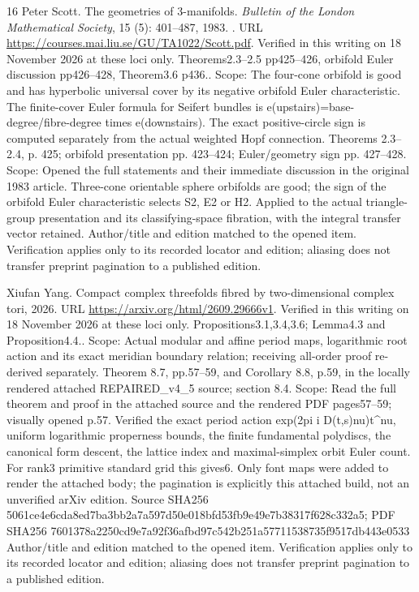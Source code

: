 \documentclass[11pt,a4paper]{article}
\theoremstyle{definition}
\begin{document}
\begin{thebibliography}{16}
Peter Scott.
\newblock The geometries of 3-manifolds.
\newblock \emph{Bulletin of the London Mathematical Society}, 15
  (5): 401--487, 1983.
\newblock {}.
\newblock URL \url{https://courses.mai.liu.se/GU/TA1022/Scott.pdf}.
\newblock Verified in this writing on 18 November 2026 at these loci only.
  Theorems2.3–2.5 pp425–426, orbifold Euler discussion pp426–428,
  Theorem3.6 p436.. Scope: The four-cone orbifold is good and has hyperbolic
  universal cover by its negative orbifold Euler characteristic. The
  finite-cover Euler formula for Seifert bundles is
  e(upstairs)=base-degree/fibre-degree times e(downstairs). The exact
  positive-circle sign is computed separately from the actual weighted Hopf
  connection. Theorems 2.3–2.4, p. 425;\allowbreak{} orbifold presentation pp. 423–424;\allowbreak{}
  Euler/geometry sign pp. 427–428. Scope: Opened the full statements and
  their immediate discussion in the original 1983 article. Three-cone
  orientable sphere orbifolds are good;\allowbreak{} the sign of the orbifold Euler
  characteristic selects S2, E2 or H2. Applied to the actual triangle-group
  presentation and its classifying-space fibration, with the integral transfer
  vector retained. Author/title and edition matched to the opened item.
  Verification applies only to its recorded locator and edition;\allowbreak{} aliasing does
  not transfer preprint pagination to a published edition.

Xiufan Yang.
\newblock Compact complex threefolds fibred by two-dimensional complex tori,
  2026.
\newblock URL \url{https://arxiv.org/html/2609.29666v1}.
\newblock Verified in this writing on 18 November 2026 at these loci only.
  Propositions3.1,3.4,3.6;\allowbreak{} Lemma4.3 and Proposition4.4.. Scope: Actual modular
  and affine period maps, logarithmic root action and its exact meridian
  boundary relation;\allowbreak{} receiving all-order proof re-derived separately. Theorem
  8.7, pp.57–59, and Corollary 8.8, p.59, in the locally rendered attached
  REPAIRED\_v4\_5 source;\allowbreak{} section 8.4. Scope: Read the full theorem and proof
  in the attached source and the rendered PDF pages57–59;\allowbreak{} visually opened
  p.57. Verified the exact period action exp(2pi i
  D(t,s)nu)t\textasciicircum{}nu, uniform logarithmic properness bounds, the
  finite fundamental polydiscs, the canonical form descent, the lattice index
  and maximal-simplex orbit Euler count. For rank3 primitive standard grid this
  gives6. Only font maps were added to render the attached body;\allowbreak{} the pagination
  is explicitly this attached build, not an unverified arXiv edition. Source
  SHA256 5061ce4e6cda8ed7ba3bb2a7a597d50e018bfd53fb9e49e7b38317f628c332a5;\allowbreak{} PDF
  SHA256 7601378a2250cd9e7a92f36afbd97c542b251a57711538735f9517db443e0533
  Author/title and edition matched to the opened item. Verification applies
  only to its recorded locator and edition;\allowbreak{} aliasing does not transfer preprint
  pagination to a published edition.

\end{thebibliography}
\end{document}
